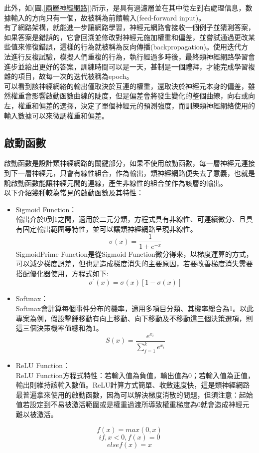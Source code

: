 \documentclass[14pt,a4paper]{report}  %
\begin{document}
 此外，如(圖.\ref{兩層神經網路})所示，是具有過濾層並在​​其中從左到右處理信息，數據輸入的方向只有一個，故被稱為前饋輸入(feed-forward input)。\\

 有了網路架構，就能進一步讓網路學習，神經元網路會接收一個例子並猜測答案，如果答案是錯誤的，它會回溯並修改對神經元施加權重和偏差，並嘗試通過更改某些值來修復錯誤，這樣的行為就被稱為反向傳播(backpropagation)。使用迭代方法進行反複試驗，模擬人們重複的行為，執行經過多時後，最終類神經網路學習會進步並給出更好的答案，訓練時間可以是一天，甚制是一個禮拜，才能完成學習複雜的項目，故每一次的迭代被稱為epoch。\\

 可以看到該神經網絡的輸出僅取決於互連的權重，還取決於神經元本身的偏差，雖然權重會影響啟動函數曲線的陡度，但是偏差會將發生變化的整個曲線，向右或向左，權重和偏差的選擇，決定了單個神經元的預測強度，而訓練類神經網絡使用的輸入數據可以來微調權重和偏差。\\
\subsection{啟動函數}
啟動函數是設計類神經網路的關鍵部分，如果不使用啟動函數，每一層神經元連接到下一層神經元，只會有線性組合，作為輸出，類神經網路便失去了意義，也就是說啟動函數能讓神經元間的連線，產生非線性的組合並作為該層的輸出。\\
以下介紹幾種較為常見的啟動函數及其特性：
\begin{itemize}
\item Sigmoid Function：\\
輸出介於0到1之間，適用於二元分類，方程式具有非線性、可連續微分、且具有固定輸出範圍等特性，並可以讓類神經網路呈現非線性。\\
$$\sigma(x)=\frac{1}{1+e^{-x}}$$
SigmoidPrime Function是從Sigmoid Function微分得來，以梯度運算的方式，可以減少梯度誤差，但也是造成梯度消失的主要原因，若要改善梯度消失需要搭配優化器使用，方程式如下:\\
$$\sigma^{'}(x)=\sigma(x)[1-\sigma(x)]$$
\item Softmax：\\
Softmax會計算每個事件分布的機率，適用多項目分類、其機率總合為1。以此專案為例，假設擊錘移動有向上移動、向下移動及不移動這三個決策選項，則這三個決策機率值總和為1。\\
$$S(x)=\frac{e^{x_i}}{\sum^k_{j=1}e^{x_i}}$$
\item ReLU Function：\\
ReLU Function方程式特性：若輸入值為負值，輸出值為0；若輸入值為正值，輸出則維持該輸入數值。ReLU計算方式簡單、收斂速度快，這是類神經網路最普遍拿來使用的啟動函數，因為可以解決梯度消散的問題，但須注意：起始值若設定到不易被激活範圍或是權重過渡所導致權重梯度為0就會造成神經元難以被激活。\\
\end{itemize}
$$f(x)=max(0,x)$$
$$if , x<0 , f(x)=0$$
$$else f(x)=x$$
\end{document}
